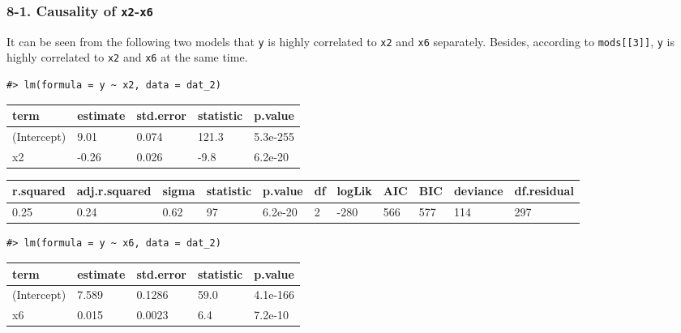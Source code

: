 \documentclass[a4paper]{article}
\begin{document}
\hypertarget{causality-of-x2-x6}{%
\subsubsection{\texorpdfstring{8-1. Causality of
\texttt{x2}-\texttt{x6}}{8-1. Causality of x2-x6}}\label{causality-of-x2-x6}}

It can be seen from the following two models that \texttt{y} is highly
correlated to \texttt{x2} and \texttt{x6} separately. Besides, according
to \texttt{mods{[}{[}3{]}{]}}, \texttt{y} is highly correlated to
\texttt{x2} and \texttt{x6} at the same time.

\begin{verbatim}
#> lm(formula = y ~ x2, data = dat_2)
\end{verbatim}

\begin{table}[H]
\centering
\begin{tabular}{lllll}
\toprule
term & estimate & std.error & statistic & p.value\\
\midrule
(Intercept) & 9.01 & 0.074 & 121.3 & 5.3e-255\\
x2 & -0.26 & 0.026 & -9.8 & 6.2e-20\\
\bottomrule
\end{tabular}
\end{table}

\begin{table}[H]
\centering
\begin{tabular}{lllllllllll}
\toprule
r.squared & adj.r.squared & sigma & statistic & p.value & df & logLik & AIC & BIC & deviance & df.residual\\
\midrule
0.25 & 0.24 & 0.62 & 97 & 6.2e-20 & 2 & -280 & 566 & 577 & 114 & 297\\
\bottomrule
\end{tabular}
\end{table}

\begin{verbatim}
#> lm(formula = y ~ x6, data = dat_2)
\end{verbatim}

\begin{table}[H]
\centering
\begin{tabular}{lllll}
\toprule
term & estimate & std.error & statistic & p.value\\
\midrule
(Intercept) & 7.589 & 0.1286 & 59.0 & 4.1e-166\\
x6 & 0.015 & 0.0023 & 6.4 & 7.2e-10\\
\bottomrule
\end{tabular}
\end{table}
\end{document}
